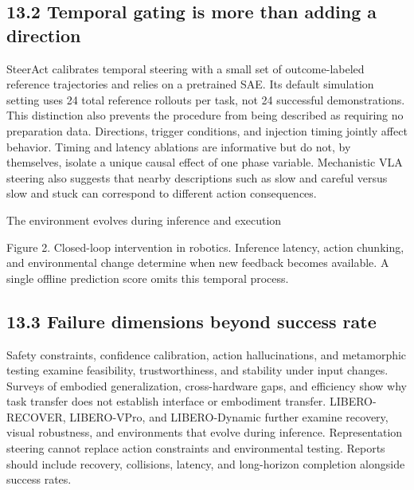 \subsection*{13.2 Temporal gating is more than adding a direction}

SteerAct calibrates temporal steering with a small set of outcome-labeled reference trajectories and relies on a pretrained SAE.\cite{r176} Its default simulation setting uses 24 total reference rollouts per task, not 24 successful demonstrations. This distinction also prevents the procedure from being described as requiring no preparation data. Directions, trigger conditions, and injection timing jointly affect behavior. Timing and latency ablations are informative but do not, by themselves, isolate a unique causal effect of one phase variable. Mechanistic VLA steering also suggests that nearby descriptions such as slow and careful versus slow and stuck can correspond to different action consequences.\cite{r189}


\begin{center}\par\small The environment evolves during inference and execution\end{center}

Figure 2. Closed-loop intervention in robotics. Inference latency, action chunking, and environmental change determine when new feedback becomes available. A single offline prediction score omits this temporal process.


\subsection*{13.3 Failure dimensions beyond success rate}

Safety constraints, confidence calibration, action hallucinations, and metamorphic testing examine feasibility, trustworthiness, and stability under input changes.\cite{r186,r188,r193,r194} Surveys of embodied generalization, cross-hardware gaps, and efficiency show why task transfer does not establish interface or embodiment transfer.\cite{r190,r191,r197} LIBERO-RECOVER, LIBERO-VPro, and LIBERO-Dynamic further examine recovery, visual robustness, and environments that evolve during inference.\cite{r198,r199,r200} Representation steering cannot replace action constraints and environmental testing. Reports should include recovery, collisions, latency, and long-horizon completion alongside success rates.


